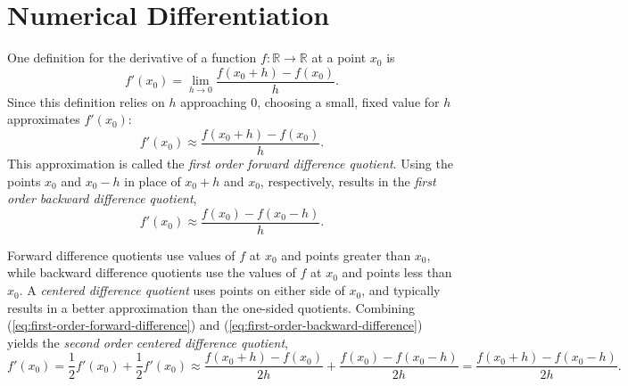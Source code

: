 \section*{Numerical Differentiation} %


One definition for the derivative of a function $f:\mathbb{R}\rightarrow\mathbb{R}$ at a point $x_0$ is
\[
f'(x_0) = \lim_{h\rightarrow 0} \frac{f(x_0 + h)-f(x_0)}{h}.
\]
Since this definition relies on $h$ approaching $0$, choosing a small, fixed value for $h$ approximates $f'(x_0)$:
\begin{equation}
f'(x_0) \approx \frac{f(x_0+h) - f(x_0)}{h}.
\label{eq:first-order-forward-difference}
\end{equation}
This approximation is called the \emph{first order forward difference quotient}.
Using the points $x_0$ and $x_0-h$ in place of $x_0+h$ and $x_0$, respectively, results in the \emph{first order backward difference quotient},
\begin{equation}
f'(x_0) \approx \frac{f(x_0) - f(x_0-h)}{h}.
\label{eq:first-order-backward-difference}
\end{equation}

Forward difference quotients use values of $f$ at $x_0$ and points greater than $x_0$, while backward difference quotients use the values of $f$ at $x_0$ and points less than $x_0$.
A \emph{centered difference quotient} uses points on either side of $x_0$, and typically results in a better approximation than the one-sided quotients.
Combining (\ref{eq:first-order-forward-difference}) and (\ref{eq:first-order-backward-difference}) yields the \emph{second order centered difference quotient},
\[
f'(x_0) = \frac{1}{2}f'(x_0) + \frac{1}{2}f'(x_0) \approx
\frac{f(x_0+h) - f(x_0)}{2h} + \frac{f(x_0) - f(x_0-h)}{2h}
= \frac{f(x_0+h) - f(x_0-h)}{2h}.
\]

